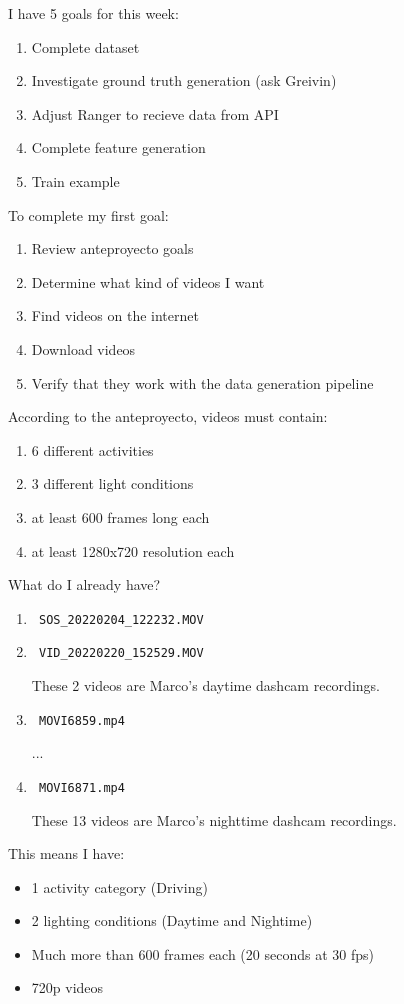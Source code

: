 \documentclass[12pt,oneside]{book}
\begin{document}
  I have 5 goals for this week:
  \begin{enumerate}
    \item Complete dataset
    \item Investigate ground truth generation (ask Greivin)
    \item Adjust Ranger to recieve data from API
    \item Complete feature generation
    \item Train example
  \end{enumerate}

  To complete my first goal:
  \begin{enumerate}
    \item Review anteproyecto goals
    \item Determine what kind of videos I want
    \item Find videos on the internet
    \item Download videos
    \item Verify that they work with the data generation pipeline
  \end{enumerate}

  According to the anteproyecto, videos must contain:
  \begin{enumerate}
    \item 6 different activities
    \item 3 different light conditions
    \item at least 600 frames long each
    \item at least 1280x720 resolution each
  \end{enumerate}

  What do I already have?
  \begin{enumerate}
    \item \lstinline| SOS_20220204_122232.MOV |
    \item \lstinline| VID_20220220_152529.MOV |
    
    These 2 videos are Marco's daytime dashcam recordings.

    \item \lstinline| MOVI6859.mp4 |
    
    ...

    \item \lstinline| MOVI6871.mp4 |
    
    These 13 videos are Marco's nighttime dashcam recordings.
  \end{enumerate}

  This means I have:
  \begin{itemize}
    \item 1 activity category (Driving)
    \item 2 lighting conditions (Daytime and Nightime)
    \item Much more than 600 frames each (20 seconds at 30 fps)
    \item 720p videos
  \end{itemize}
  
\end{document}
